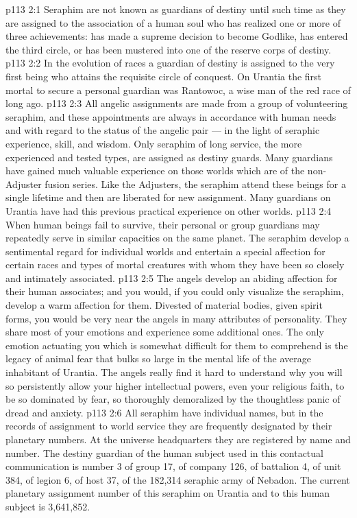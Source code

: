\vs p113 2:1 Seraphim are not known as guardians of destiny until such time as they are assigned to the association of a human soul who has realized one or more of three achievements: has made a supreme decision to become Godlike, has entered the third circle, or has been mustered into one of the reserve corps of destiny.
\vs p113 2:2 In the evolution of races a guardian of destiny is assigned to the very first being who attains the requisite circle of conquest. On Urantia the first mortal to secure a personal guardian was Rantowoc, a wise man of the red race of long ago.
\vs p113 2:3 All angelic assignments are made from a group of volunteering seraphim, and these appointments are always in accordance with human needs and with regard to the status of the angelic pair --- in the light of seraphic experience, skill, and wisdom. Only seraphim of long service, the more experienced and tested types, are assigned as destiny guards. Many guardians have gained much valuable experience on those worlds which are of the non\hyp{}Adjuster fusion series. Like the Adjusters, the seraphim attend these beings for a single lifetime and then are liberated for new assignment. Many guardians on Urantia have had this previous practical experience on other worlds.
\vs p113 2:4 \pc When human beings fail to survive, their personal or group guardians may repeatedly serve in similar capacities on the same planet. The seraphim develop a sentimental regard for individual worlds and entertain a special affection for certain races and types of mortal creatures with whom they have been so closely and intimately associated.
\vs p113 2:5 The angels develop an abiding affection for their human associates; and you would, if you could only visualize the seraphim, develop a warm affection for them. Divested of material bodies, given spirit forms, you would be very near the angels in many attributes of personality. They share most of your emotions and experience some additional ones. The only emotion actuating you which is somewhat difficult for them to comprehend is the legacy of animal fear that bulks so large in the mental life of the average inhabitant of Urantia. The angels really find it hard to understand why you will so persistently allow your higher intellectual powers, even your religious faith, to be so dominated by fear, so thoroughly demoralized by the thoughtless panic of dread and anxiety.
\vs p113 2:6 \pc All seraphim have individual names, but in the records of assignment to world service they are frequently designated by their planetary numbers. At the universe headquarters they are registered by name and number. The destiny guardian of the human subject used in this contactual communication is number 3 of group 17, of company 126, of battalion 4, of unit 384, of legion 6, of host 37, of the 182,314 seraphic army of Nebadon. The current planetary assignment number of this seraphim on Urantia and to this human subject is 3,641,852.
